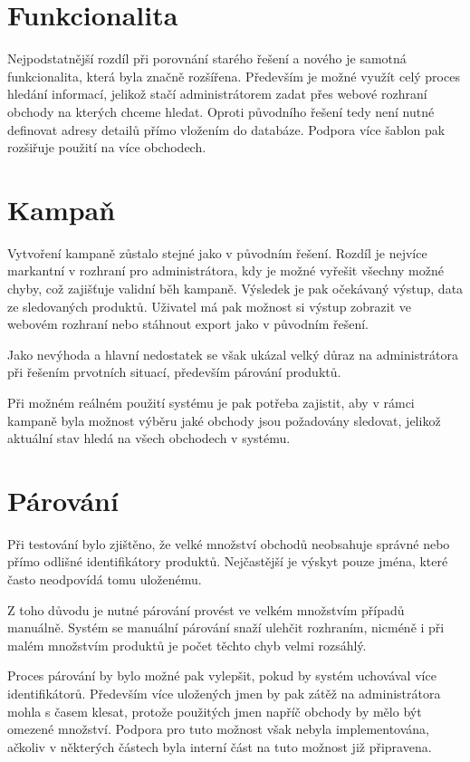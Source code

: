 \documentclass[thesis=B,czech]{FITthesis}[2012/06/26]
\begin{document}
\section{Funkcionalita}
Nejpodstatnější rozdíl při porovnání starého řešení a nového je samotná funkcionalita, která byla značně rozšířena. Především je možné
využít celý proces hledání informací, jelikož stačí administrátorem zadat přes webové rozhraní obchody na kterých chceme hledat.
Oproti původního řešení tedy není nutné definovat adresy detailů přímo vložením do databáze. 
Podpora více šablon pak rozšiřuje použití na více obchodech.

\section{Kampaň}
Vytvoření kampaně zůstalo stejné jako v původním řešení. Rozdíl je nejvíce markantní v rozhraní pro administrátora, kdy je
možné vyřešit všechny možné chyby, což zajišťuje validní běh kampaně. Výsledek je pak očekávaný výstup, data ze sledovaných
produktů. Uživatel má pak možnost si výstup zobrazit ve webovém rozhraní nebo stáhnout export jako v původním řešení.
\par
Jako nevýhoda a hlavní nedostatek se však ukázal velký důraz na administrátora při řešením prvotních situací, především párování produktů.
\par
Při možném reálném použití systému je pak potřeba zajistit, aby v rámci kampaně byla možnost výběru jaké obchody jsou požadovány sledovat, jelikož
aktuální stav hledá na všech obchodech v systému.

\section{Párování}
Při testování bylo zjištěno, že velké množství obchodů neobsahuje správné nebo přímo odlišné identifikátory produktů. Nejčastější je výskyt pouze jména, které často neodpovídá tomu uloženému.
\par
Z toho důvodu je nutné párování provést ve velkém množstvím případů manuálně. Systém se manuální párování snaží ulehčit rozhraním, nicméně i při malém množstvím 
produktů je počet těchto chyb velmi rozsáhlý. 
\par
Proces párování by bylo možné pak vylepšit, pokud by systém uchovával více identifikátorů. Především více uložených jmen by pak zátěž na administrátora mohla s časem klesat, protože použitých jmen napříč obchody by mělo být omezené množství. 
Podpora pro tuto možnost však nebyla implementována, ačkoliv v některých částech byla interní část na tuto možnost již připravena.
\end{document}

